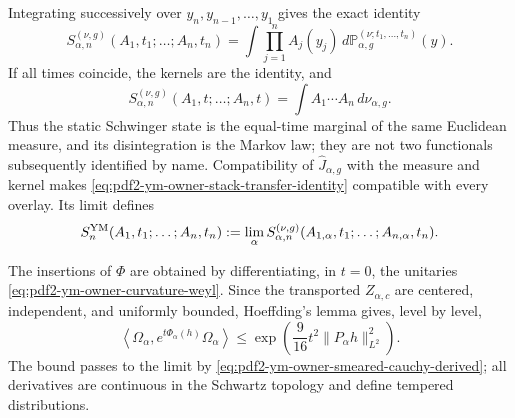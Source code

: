 Integrating successively over $y_n,y_{n-1},\ldots,y_1$ gives the exact identity
\begin{equation}\label{eq:pdf2-ym-owner-stack-transfer-identity}
 S_{\alpha,n}^{(\nu,g)}(A_1,t_1;\ldots;A_n,t_n)
 =\int\prod_{j=1}^nA_j(y_j)\,
   d\mathbb P_{\alpha,g}^{(\nu;t_1,\ldots,t_n)}(y).
\end{equation}
If all times coincide, the kernels are the identity, and
\begin{equation}\label{eq:pdf2-ym-owner-static-is-stack}
 S_{\alpha,n}^{(\nu,g)}(A_1,t;\ldots;A_n,t)
 =\int A_1\cdots A_n\,d\nu_{\alpha,g}.
\end{equation}
Thus the static Schwinger state is the equal-time marginal of the same
Euclidean measure, and its disintegration is the Markov law; they are not two functionals
subsequently identified by name.
Compatibility of $\widehat J_{\alpha,g}$ with the measure and kernel makes
\eqref{eq:pdf2-ym-owner-stack-transfer-identity} compatible with every overlay. Its limit defines
\begin{equation}\label{eq:pdf2-ym-owner-schwinger-functionals}
 S_n^{\rm YM}(A_1,t_1;\ldots;A_n,t_n)
 :=\lim_{\alpha}S_{\alpha,n}^{(\nu,g)}
 (A_{1,\alpha},t_1;\ldots;A_{n,\alpha},t_n).
\end{equation}

The insertions of $\Phi$ are obtained by differentiating, in $t=0$, the unitaries
\eqref{eq:pdf2-ym-owner-curvature-weyl}. Since the transported $Z_{\alpha,c}$ are
centered, independent, and uniformly bounded, Hoeffding's lemma gives,
level by level,
\begin{equation}\label{eq:pdf2-ym-owner-subgaussian-bound}
 \left\langle\Omega_\alpha,
 e^{t\Phi_\alpha(h)}\Omega_\alpha\right\rangle
 \le \exp\!\left(\frac9{16}t^2\|P_\alpha h\|_{L^2}^2\right).
\end{equation}
The bound passes to the limit by
\eqref{eq:pdf2-ym-owner-smeared-cauchy-derived}; all derivatives are continuous in
the Schwartz topology and define tempered distributions.

